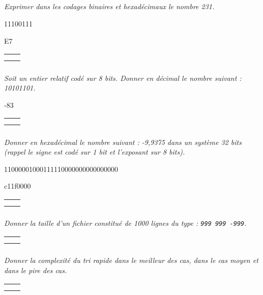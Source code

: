 \documentclass[10pt,fleqn]{article} %
\begin{document}

\vspace{2cm}
\pagestyle{fancy}
\thispagestyle{plain}

\subparagraph{}
\textit{Exprimer dans les codages binaires et hexadécimaux le nombre 231.}

\ifprof
\begin{corrige}
11100111

E7
\end{corrige}
\else
\noindent\begin{tabular}{|p{\linewidth}|}
\hline
$$ \quad $$ \\
$$ \quad $$ \\
\hline
\end{tabular}
\fi
\subparagraph{}
\textit{Soit un entier relatif codé sur 8 bits. Donner en décimal le nombre suivant : 10101101.}

\ifprof
\begin{corrige}
-83
\end{corrige}
\else
\noindent\begin{tabular}{|p{\linewidth}|}
\hline
$$ \quad $$ \\
$$ \quad $$ \\
\hline
\end{tabular}
\fi

\subparagraph{}
\textit{Donner en hexadécimal le nombre suivant : -9,9375 dans un système 32 bits (rappel le signe est codé sur 1 bit et l'exposant sur 8 bits).}

\ifprof
\begin{corrige}
11000001000111110000000000000000

c11f0000
\end{corrige}
\else
\noindent\begin{tabular}{|p{\linewidth}|}
\hline
$$ \quad $$ \\
$$ \quad $$ \\
\hline
\end{tabular}
\fi


\subparagraph{}
\textit{Donner la taille d'un fichier constitué de 1000 lignes du type : \texttt{999 999 -999}.}

\ifprof
\begin{corrige}

\end{corrige}
\else
\noindent\begin{tabular}{|p{\linewidth}|}
\hline
$$ \quad $$ \\
$$ \quad $$ \\
\hline
\end{tabular}
\fi

\subparagraph{}
\textit{Donner la complexité du tri rapide dans le meilleur des cas, dans le cas moyen et dans le pire des cas.}
\ifprof
\begin{corrige}

\end{corrige}
\else
\noindent\begin{tabular}{|p{\linewidth}|}
\hline
$$ \quad $$ \\
$$ \quad $$ \\
\hline
\end{tabular}
\fi
\end{document}
